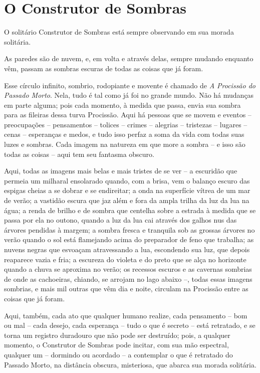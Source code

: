 \chapter{O Construtor de Sombras}

O solitário Construtor de Sombras está sempre observando em sua morada
solitária.

As paredes são de nuvem, e, em volta e através delas, sempre mudando
enquanto vêm, passam as sombras escuras de todas as coisas que já foram.

Esse círculo infinito, sombrio, rodopiante e movente é chamado de
\emph{A Procissão do Passado Morto}. Nela, tudo é tal como já foi no
grande mundo. Não há mudanças em parte alguma; pois cada momento, à
medida que passa, envia sua sombra para as fileiras dessa turva
Procissão. Aqui há pessoas que se movem e eventos -- preocupações --
pensamentos -- tolices -- crimes -- alegrias -- tristezas -- lugares --
cenas -- esperanças e medos, e tudo isso perfaz a soma da vida com todas
suas luzes e sombras. Cada imagem na natureza em que more a sombra -- e
isso são todas as coisas -- aqui tem seu fantasma obscuro.

Aqui, todas as imagens mais belas e mais tristes de se ver -- a
escuridão que permeia um milharal ensolarado quando, com a brisa, vem o
balanço escuro das espigas cheias a se dobrar e se endireitar; a onda na
superfície vítrea de um mar de verão; a vastidão escura que jaz além e
fora da ampla trilha da luz da lua na água; a renda de brilho e de
sombra que centelha sobre a estrada à medida que se passa por ela no
outono, quando a luz da lua cai através dos galhos nus das árvores
pendidas à margem; a sombra fresca e tranquila sob as grossas árvores no
verão quando o sol está flamejando acima do preparador de feno que
trabalha; as nuvens negras que esvoaçam atravessando a lua, escondendo
sua luz, que depois reaparece vazia e fria; a escureza do violeta e do
preto que se alça no horizonte quando a chuva se aproxima no verão; os
recessos escuros e as cavernas sombrias de onde as cachoeiras, chiando,
se arrojam no lago abaixo --, todas essas imagens sombrias, e mais mil
outras que vêm dia e noite, circulam na Procissão entre as coisas que já
foram.

Aqui, também, cada ato que qualquer humano realize, cada pensamento --
bom ou mal -- cada desejo, cada esperança -- tudo o que é secreto --
está retratado, e se torna um registro duradouro que não pode ser
destruído; pois, a qualquer momento, o Construtor de Sombras pode
incitar, com sua mão espectral, qualquer um -- dormindo ou acordado -- a
contemplar o que é retratado do Passado Morto, na distância obscura,
misteriosa, que abarca sua morada solitária.

